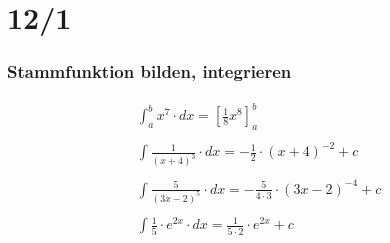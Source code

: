 \part{12/1}

\section{Stammfunktion bilden, integrieren}
\begin{gather*}
  \int_a^b x^7 \cdot dx = \left[\frac{1}{8}x^8\right]_a^b \\\\
  \int \frac{1}{(x + 4)^3} \cdot dx = -\frac{1}{2} \cdot (x + 4)^{-2} + c \\\\
  \int \frac{5}{(3x - 2)^5} \cdot dx = -\frac{5}{4 \cdot 3} \cdot (3x - 2)^{-4} + c \\\\
  \int \frac{1}{5} \cdot e^{2x} \cdot dx = \frac{1}{5 \cdot 2} \cdot e^{2x} + c
\end{gather*}
